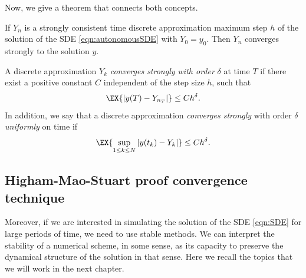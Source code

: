 Now, we give a theorem that connects both concepts.
\begin{thm}\label{thm:ConsistencyConvergence}
	If $Y_n$ is a strongly consistent time discrete approximation maximum step $h$ of the
	solution  of the SDE \eqref{eqn:autonomousSDE} with $Y_0=y_0$. Then $Y_n$ converges
	strongly to the solution $y$.
\end{thm} 

\begin{definition}[order]
	A discrete approximation $Y_k$ \emph{converges strongly with order} $\delta$ at time $T$ if there exist a positive 
	constant $C$ independent of the step size $h$, such that
	\begin{equation}
	\EX{|y(T)-Y_{n_T}|} \leq C h^\delta.
	\end{equation}
	In addition, we say that a discrete approximation \emph{converges strongly} with order $\delta$ \emph{uniformly} on
	 time if
	\begin{equation}
	\EX{
		\sup_{1 \leq k\leq N}
		|y(t_k)-Y_k|
	}\leq C h^{\delta}.
	\end{equation}
\end{definition}


\subsection{Higham-Mao-Stuart proof convergence technique} \label{sec:HMS-Technique}
	
	Moreover, if we are interested in simulating the solution of the SDE \eqref{eqn:SDE} for large periods of time, 
	we need to use stable methods. We can interpret the stability of a numerical scheme, in some sense, as its
	capacity to preserve the  dynamical structure of the solution in that sense. Here we recall the topics that we will 
	work in the next chapter.
